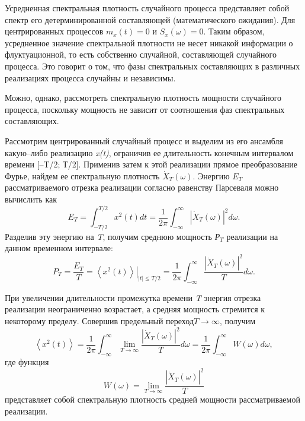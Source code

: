 Усредненная спектральная плотность случайного процесса представляет собой спектр его детерминированной составляющей (математического ожидания). Для центрированных процессов $m_{x} (t)=0$ и $\overline{S_{x} (\omega )}=0$. Таким образом, усредненное значение спектральной плотности не несет никакой информации о флуктуационной, то есть собственно случайной, составляющей случайного процесса. Это говорит о том, что фазы спектральных составляющих в различных реализациях процесса случайны и независимы.

Можно, однако, рассмотреть спектральную плотность мощности случайного процесса, поскольку мощность не зависит от соотношения фаз спектральных составляющих.

Рассмотрим центрированный случайный процесс и выделим из его ансамбля какую--либо реализацию \textit{x(t)}, ограничив ее длительность конечным интервалом времени [--T/2; Т/2]. Применив затем к этой реализации прямое преобразование Фурье, найдем ее спектральную плотность $\dot{X}_{T} (\omega )$. Энергию $E_{T} $ рассматриваемого отрезка реализации согласно равенству Парсеваля можно вычислить как
\begin{equation} \label{GrindEQ__1_5_2_}
E_{T} =\int _{-T/2}^{T/2}x^{2} (t)dt =\frac{1}{2\pi } \int _{-\infty }^{\infty }\left|\dot{X}_{T} (\omega )\right|^{2} d\omega .
\end{equation}
Разделив эту энергию на \textit{T}, получим среднюю мощность \textit{Р${}_{T}$} реализации на данном временном интервале:
\begin{equation} \label{GrindEQ__1_5_3_}
P_{T} =\frac{E_{T} }{T} =\left. \left\langle x^{2} (t)\right\rangle \right|_{\left|t\right|\le T/2} =\frac{1}{2\pi } \int _{-\infty }^{\infty }\frac{\left|\dot{X}_{T} (\omega )\right|^{2} }{T} d\omega .
\end{equation}

При увеличении длительности промежутка времени \textit{T} энергия отрезка реализации неограниченно возрастает, а средняя мощность стремится к некоторому пределу. Совершив предельный переход$T\to \infty $, получим
\begin{equation} \label{GrindEQ__1_5_4_}
\left\langle x^{2} (t)\right\rangle =\frac{1}{2\pi } \int _{-\infty }^{\infty }\mathop{\lim }\limits_{T\to \infty } \frac{\left|\dot{X}_{T} (\omega )\right|^{2} }{T} d\omega =\frac{1}{2\pi } \int _{-\infty }^{\infty }W(\omega )d\omega  ,
\end{equation}
где функция
\begin{equation} \label{GrindEQ__1_5_5_}
W(\omega )=\mathop{\lim }\limits_{T\to \infty } \frac{\left|\dot{X}_{T} (\omega )\right|^{2} }{T}
\end{equation}
представляет собой спектральную плотность средней мощности рассматриваемой реализации.

